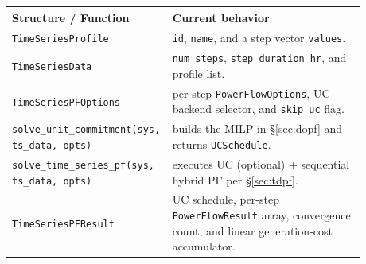 \begin{longtable}{L{0.34\linewidth}L{0.54\linewidth}}
\toprule
Structure / Function & Current behavior \\
\midrule
\endhead
\texttt{TimeSeriesProfile} &
  \texttt{id}, \texttt{name}, and a step vector \texttt{values}. \\
\texttt{TimeSeriesData} &
  \texttt{num\_steps}, \texttt{step\_duration\_hr}, and profile list. \\
\texttt{TimeSeriesPFOptions} &
  per-step \texttt{PowerFlowOptions}, UC backend selector, and
  \texttt{skip\_uc} flag. \\
\texttt{solve\_unit\_commitment(sys, ts\_data, opts)} &
  builds the MILP in \S\ref{sec:dopf} and returns \texttt{UCSchedule}. \\
\texttt{solve\_time\_series\_pf(sys, ts\_data, opts)} &
  executes UC (optional) + sequential hybrid PF per \S\ref{sec:tdpf}. \\
\texttt{TimeSeriesPFResult} &
  UC schedule, per-step \texttt{PowerFlowResult} array, convergence count,
  and linear generation-cost accumulator. \\
\bottomrule
\end{longtable}
